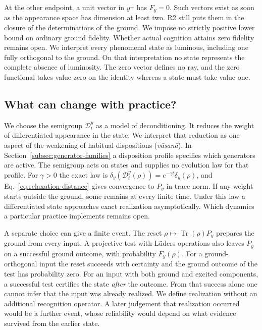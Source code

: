 \documentclass[11pt]{article}
\theoremstyle{definition}
\DeclareMathOperator{\Tr}{Tr}
\begin{document}
At the other endpoint, a unit vector in $y^\perp$ has $F_y=0$. Such vectors exist as soon as the appearance space has dimension at least two. R2 still puts them in the closure of the determinations of the ground. We impose no strictly positive lower bound on ordinary ground fidelity. Whether actual cognition attains zero fidelity remains open. We interpret every phenomenal state as luminous, including one fully orthogonal to the ground. On that interpretation no state represents the complete absence of luminosity. The zero vector defines no ray, and the zero functional takes value zero on the identity whereas a state must take value one.

\subsection{What can change with practice?}
\label{subsec:realization-practice}

We choose the semigroup $\mathcal D_t^y$ as a model of deconditioning. It reduces the weight of differentiated appearance in the state. We interpret that reduction as one aspect of the weakening of habitual dispositions (\emph{v\=asan\=a}). In Section~\ref{subsec:generator-families} a disposition profile specifies which generators are active. The semigroup acts on states and supplies no evolution law for that profile. For $\gamma>0$ the exact law is $\delta_y(\mathcal D_t^y(\rho))=e^{-\gamma t}\delta_y(\rho)$, and Eq.~\eqref{eq:relaxation-distance} gives convergence to $P_y$ in trace norm. If any weight starts outside the ground, some remains at every finite time. Under this law a differentiated state approaches exact realization asymptotically. Which dynamics a particular practice implements remains open.

A separate choice can give a finite event. The reset $\rho\mapsto\Tr(\rho)P_y$ prepares the ground from every input. A projective test with L\"uders operations also leaves $P_y$ on a successful ground outcome, with probability $F_y(\rho)$. For a ground-orthogonal input the reset succeeds with certainty and the ground outcome of the test has probability zero. For an input with both ground and excited components, a successful test certifies the state \emph{after} the outcome. From that success alone one cannot infer that the input was already realized. We define realization without an additional recognition operator. A later judgement that realization occurred would be a further event, whose reliability would depend on what evidence survived from the earlier state.
\end{document}
